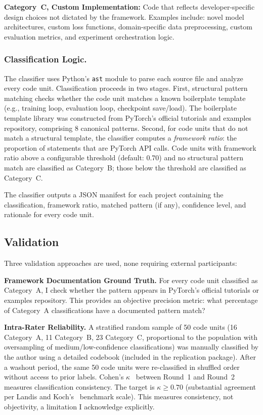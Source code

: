 \documentclass[smallextended,natbib]{svjour3}
\begin{document}
\textbf{Category~C, Custom Implementation:} Code that reflects developer-specific design choices not dictated by the framework. Examples include: novel model architectures, custom loss functions, domain-specific data preprocessing, custom evaluation metrics, and experiment orchestration logic.

\subsubsection{Classification Logic.}
The classifier uses Python's \texttt{ast} module to parse each source file and analyze every code unit. Classification proceeds in two stages. First, structural pattern matching checks whether the code unit matches a known boilerplate template (e.g., training loop, evaluation loop, checkpoint save/load). The boilerplate template library was constructed from PyTorch's official tutorials and examples repository, comprising 8 canonical patterns. Second, for code units that do not match a structural template, the classifier computes a \emph{framework ratio}: the proportion of statements that are PyTorch API calls. Code units with framework ratio above a configurable threshold (default: 0.70) and no structural pattern match are classified as Category~B; those below the threshold are classified as Category~C.

The classifier outputs a JSON manifest for each project containing the classification, framework ratio, matched pattern (if any), confidence level, and rationale for every code unit.

\subsection{Validation}

Three validation approaches are used, none requiring external participants:

\textbf{Framework Documentation Ground Truth.} For every code unit classified as Category~A, I check whether the pattern appears in PyTorch's official tutorials or examples repository. This provides an objective precision metric: what percentage of Category~A classifications have a documented pattern match?

\textbf{Intra-Rater Reliability.} A stratified random sample of 50 code units (16 Category~A, 11 Category~B, 23 Category~C, proportional to the population with oversampling of medium/low-confidence classifications) was manually classified by the author using a detailed codebook (included in the replication package). After a washout period, the same 50 code units were re-classified in shuffled order without access to prior labels. Cohen's $\kappa$~\citep{cohen1960} between Round~1 and Round~2 measures classification consistency. The target is $\kappa \geq 0.70$ (substantial agreement per Landis and Koch's~\citep{landis1977} benchmark scale). This measures consistency, not objectivity, a limitation I acknowledge explicitly.
\end{document}
